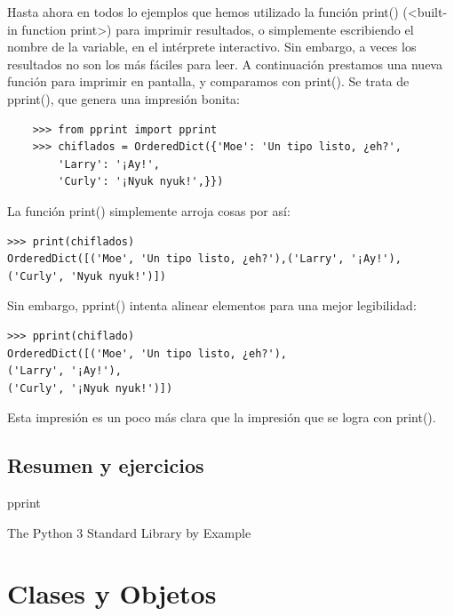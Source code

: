 
Hasta ahora en todos lo ejemplos que hemos  utilizado la función  {\ttfamily print()} ({\ttfamily {}<{}built-in function print{}>{}}) para imprimir resultados, o simplemente escribiendo el nombre de la variable, en el  intérprete interactivo. Sin embargo, a veces los resultados no son los más fáciles para leer. A continuación prestamos una nueva función para imprimir en pantalla, y comparamos con {\ttfamily print()}. Se trata de {\ttfamily pprint()}, que genera  una impresión bonita:

\begin{lstlisting}
	>>> from pprint import pprint
	>>> chiflados = OrderedDict({'Moe': 'Un tipo listo, ¿eh?',
		'Larry': '¡Ay!',
		'Curly': '¡Nyuk nyuk!',}})
		\end{lstlisting}
		La función  {\ttfamily	print()} simplemente arroja cosas por así:
		\begin{lstlisting}
>>> print(chiflados)
OrderedDict([('Moe', 'Un tipo listo, ¿eh?'),('Larry', '¡Ay!'),
('Curly', 'Nyuk nyuk!')])
\end{lstlisting}

\noindent Sin embargo, {\ttfamily pprint()} intenta alinear elementos para una mejor legibilidad:

\begin{lstlisting}
>>> pprint(chiflado)
OrderedDict([('Moe', 'Un tipo listo, ¿eh?'),
('Larry', '¡Ay!'),
('Curly', '¡Nyuk nyuk!')])
\end{lstlisting}

Esta impresión es un poco más clara que la impresión que se logra con {\ttfamily print()}.


\section{Resumen y ejercicios }
pprint



The Python 3 Standard Library by Example




\chapter{Clases y Objetos}{\label{Cap9}}\hypertarget{Cap9}{}


